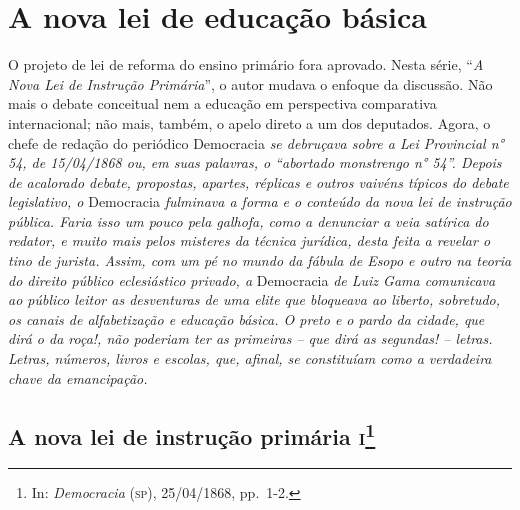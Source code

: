 \part{A nova lei de educação básica}

\begin{argumento}
O projeto de lei de reforma do ensino primário fora aprovado. Nesta
série, ``\emph{A Nova Lei de Instrução Primária}'', o autor mudava o
enfoque da discussão. Não mais o debate conceitual nem a educação em
perspectiva comparativa internacional; não mais, também, o apelo direto
a um dos deputados. Agora, o chefe de redação do periódico Democracia
\emph{se debruçava sobre a Lei Provincial n° 54, de 15/04/1868 ou, em
suas palavras, o ``abortado monstrengo n° 54''. Depois de acalorado
debate, propostas, apartes, réplicas e outros vaivéns típicos do debate
legislativo, o} Democracia \emph{fulminava a forma e o conteúdo da nova
lei de instrução pública. Faria isso um pouco pela galhofa, como a
denunciar a veia satírica do redator, e muito mais pelos misteres da
técnica jurídica, desta feita a revelar o tino de jurista. Assim, com um
pé no mundo da fábula de Esopo e outro na teoria do direito público
eclesiástico privado, a} Democracia \emph{de Luiz Gama comunicava ao
público leitor as desventuras de uma elite que bloqueava ao liberto,
sobretudo, os canais de alfabetização e educação básica. O preto e o
pardo da cidade, que dirá o da roça!, não poderiam ter as primeiras --
que dirá as segundas! -- letras. Letras, números, livros e escolas, que,
afinal, se constituíam como a verdadeira chave da emancipação.}
\end{argumento}

\chapter{A nova lei de instrução primária \textsc{i}\footnote{In:
  \emph{Democracia} (\textsc{sp}), 25/04/1868, pp.~1-2.}}


